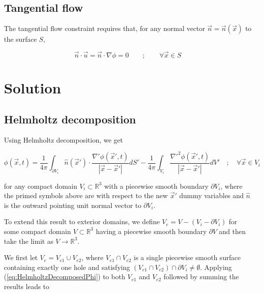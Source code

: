 \documentclass{article}
\begin{document}
\subsection{Tangential flow}

The tangential flow constraint requires that, for any normal vector $\vec{n} =
\vec{n}(\vec{x})$ to the surface $S$,

\begin{equation}
\label{eq:TangentialFlowConstraint}
	\vec{n} \cdot \vec{u} = \vec{n} \cdot \nabla \phi = 0 \qquad ; \qquad
	\forall \vec{x} \in S
\end{equation}

\section{Solution}

\subsection{Helmholtz decomposition}

Using Helmholtz decomposition, we get

\begin{equation}
\label{eq:HelmholtzDecomposedPhi}
	\phi(\vec{x}, t) = \frac{1}{4 \pi} \int_{\partial V_i} \hat{n}(\vec{x}')
	\cdot \frac{\nabla' \phi(\vec{x}', t)}{|\vec{x} - \vec{x}'|} dS' -
	\frac{1}{4 \pi} \int_{V_i} \frac{\nabla'^2 \phi(\vec{x}', t)}{|\vec{x} -
	\vec{x}'|} dV' \quad ; \quad \forall \vec{x} \in V_i
\end{equation}

for any compact domain $V_i \subset \mathbb{R}^3$ with a piecewise smooth
boundary $\partial V_i$, where the primed symbols above are with respect to the
new $\vec{x}'$ dummy variables and $\hat{n}$ is the outward pointing unit
normal vector to $\partial V_i$.

To extend this result to exterior domains, we define $V_e = V - (V_i - \partial
V_i)$ for some compact domain $V \subset \mathbb{R}^3$ having a piecewise smooth
boundary $\partial V$ and then take the limit as $V \rightarrow \mathbb{R}^3$.

We first let $V_e = V_{e1} \cup V_{e2}$, where $V_{e1} \cap V_{e2}$ is a single
piecewise smooth surface containing exactly one hole and satisfying $(V_{e1}
\cap V_{e2}) \cap \partial V_i \neq \emptyset$. Applying 
(\ref{eq:HelmholtzDecomposedPhi}) to both $V_{e1}$ and $V_{e2}$ followed by
summing the results leads to
\end{document}
